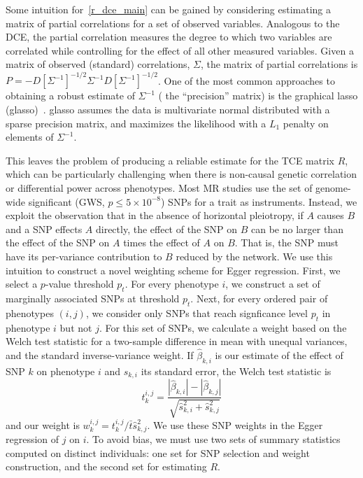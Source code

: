 \documentclass{article}
\begin{document}
Some intuition for~\eqref{r_dce_main} can be gained by considering estimating a matrix of partial correlations for a set of observed variables.
Analogous to the DCE, the partial correlation measures the degree to which two
variables are correlated while controlling for the effect of all other measured
variables. Given a matrix of observed (standard) correlations, $\Sigma$, the matrix of
partial correlations is $P = -D[\Sigma^{-1}]^{-1/2} \Sigma^{-1} D[\Sigma^{-1}]^{-1/2}$. One of
the most common approaches to obtaining a robust estimate of $\Sigma^{-1}$ (
the ``precision'' matrix) is the graphical lasso (glasso)~\cite{Friedman2007}.
glasso assumes the data is multivariate normal distributed with a sparse
precision matrix, and maximizes the likelihood with a $L_1$ penalty on elements of $\Sigma^{-1}$.

This leaves the problem of producing a reliable estimate for the TCE matrix $R$,
which can be particularly challenging when there is non-causal genetic correlation or
differential power across phenotypes. Most MR studies use the set of
genome-wide significant (GWS, $p \le 5\times 10^{-8}$) SNPs for a trait  as instruments.
Instead, we exploit the observation that in the absence of horizontal pleiotropy, 
if $A$ causes $B$ and a SNP effects $A$ directly,
the effect of the SNP on $B$ can be no larger than the effect of the SNP on $A$ times
the effect of $A$ on $B$. That is, the SNP must have its per-variance contribution to
$B$ reduced by the network. We use this intuition to construct a novel
weighting scheme for Egger regression.
First, we select a $p$-value threshold $p_t$. For every phenotype $i$, we
 construct a set of marginally associated SNPs at threshold $p_t$. Next,
 for every ordered pair of phenotypes $(i, j)$, we consider only SNPs that reach
 signficance level $p_t$ in phenotype $i$ but not $j$. For this set of SNPs, we calculate
 a weight based on the Welch test statistic for a two-sample difference in mean with unequal
 variances,
 and the standard inverse-variance weight. If $\hat{\beta}_{k, i}$ is our estimate
 of the effect of SNP $k$ on phenotype $i$ and $\hat{s}_{k, i}$ its standard error,
 the Welch test statistic is~\cite{Welch1947}
\begin{equation}
t^{i,j}_k = \frac{|\hat{\beta}_{k, i}| - |\hat{\beta}_{k, j}|}
  {\sqrt{\hat{s}^2_{k, i} + \hat{s}^2_{k, j}}}
\end{equation}
and our weight is $w^{i, j}_k = t^{i,j}_k/\bar{t} \hat{s}_{k, j}^2$.
We use these SNP weights in the Egger regression of $j$ on $i$.
To avoid bias, we must use two sets of summary
statistics computed on distinct individuals: one set for SNP selection and weight construction,
 and the second set for estimating $R$.
\end{document}
